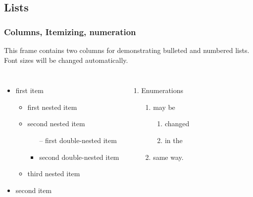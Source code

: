 \documentclass[aspectratio=169]{beamer}
\begin{document}
\subsection{Lists}
\begin{frame}[mpidrbackground=2]
    \frametitle{Columns, Itemizing, numeration}
   This frame contains two columns for demonstrating bulleted and numbered lists. Font sizes will be changed automatically.
	
   \begin{columns}
         \begin{itemize}
            \item first item
                  \begin{itemize}
                     \item first nested item 
                     \item second nested item
                           \begin{itemize}
                              \item[--] first double-nested item
                              \item second double-nested item
                           \end{itemize}
                     \item third nested item
                  \end{itemize}
            \item second item
         \end{itemize}

         \begin{enumerate}
            \item Enumerations
                  \begin{enumerate}
                     \item may be
                           \begin{enumerate}
                              \item changed
                              \item in the
                           \end{enumerate}
                     \item same way.
                  \end{enumerate}
         \end{enumerate}
   \end{columns}

\end{frame}
\end{document}
